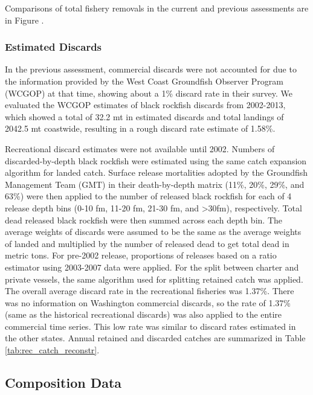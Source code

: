 \documentclass[11pt,
  english,
  letterpaper,
]{article}
\begin{document}
Comparisons of total fishery removals in the current and previous assessments are in Figure .

\hypertarget{estimated-discards}{%
\subsubsection{Estimated Discards}\label{estimated-discards}}

In the previous assessment, commercial discards were not accounted for due to the information provided by the West Coast Groundfish Observer Program (WCGOP) at that time, showing about a 1\% discard rate in their survey. We evaluated the WCGOP estimates of black rockfish discards from 2002-2013, which showed a total of 32.2 mt in estimated discards and total landings of 2042.5 mt coastwide, resulting in a rough discard rate estimate of 1.58\%.

Recreational discard estimates were not available until 2002. Numbers of discarded-by-depth black rockfish were estimated using the same catch expansion algorithm for landed catch. Surface release mortalities adopted by the Groundfish Management Team (GMT) in their death-by-depth matrix (11\%, 20\%, 29\%, and 63\%) were then applied to the number of released black rockfish for each of 4 release depth bins (0-10 fm, 11-20 fm, 21-30 fm, and \textgreater30fm), respectively. Total dead released black rockfish were then summed across each depth bin. The average weights of discards were assumed to be the same as the average weights of landed and multiplied by the number of released dead to get total dead in metric tons. For pre-2002 release, proportions of releases based on a ratio estimator using 2003-2007 data were applied. For the split between charter and private vessels, the same algorithm used for splitting retained catch was applied. The overall average discard rate in the recreational fisheries was 1.37\%. There was no information on Washington commercial discards, so the rate of 1.37\% (same as the historical recreational discards) was also applied to the entire commercial time series. This low rate was similar to discard rates estimated in the other states. Annual retained and discarded catches are summarized in Table \ref{tab:rec_catch_reconstr}.

\hypertarget{composition-data}{%
\subsection{Composition Data}\label{composition-data}}
\end{document}

